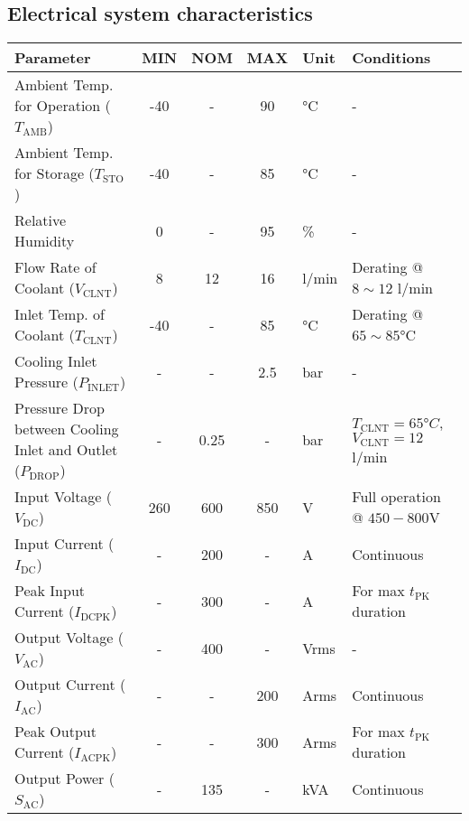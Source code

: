 \subsection{Electrical system characteristics}   
\begin{table}[H]
    \centering
    \begin{adjustbox}{width=\textwidth,center}
    \begin{tabular}{|l|c|c|c|l|l|}
        \hline
        \textbf{Parameter} & \textbf{MIN} & \textbf{NOM} & \textbf{MAX} & \textbf{Unit} & \textbf{Conditions} \\
        \hline
        Ambient Temp. for Operation ($T_{\text{AMB}}$) & -40 & - & 90 & °C & - \\
        \hline
        Ambient Temp. for Storage ($T_{\text{STO}}$) & -40 & - & 85 & °C & - \\
        \hline
        Relative Humidity & 0 & - & 95 & \% & - \\
        \hline
        Flow Rate of Coolant ($V_{\text{CLNT}}$) & 8 & 12 & 16 & l/min & Derating @ $8\sim12$ l/min \\
        \hline
        Inlet Temp. of Coolant ($T_{\text{CLNT}}$) & -40 & - & 85 & °C & Derating @ $65\sim85$°C \\
        \hline
        Cooling Inlet Pressure ($P_{\text{INLET}}$) & - & - & 2.5 & bar & - \\
        \hline
        Pressure Drop between Cooling Inlet and Outlet ($P_{\text{DROP}}$) & - & 0.25 & - & bar & $T_{\text{CLNT}}=65°C$, $V_{\text{CLNT}}=12$ l/min \\
        \hline
        Input Voltage ($V_{\text{DC}}$) & 260 & 600 & 850 & V & Full operation @ $450-800$V \\
        \hline
        Input Current ($I_{\text{DC}}$) & - & 200 & - & A & Continuous \\
        \hline
        Peak Input Current ($I_{\text{DCPK}}$) & - & 300 & - & A & For max $t_{\text{PK}}$ duration \\
        \hline
        Output Voltage ($V_{\text{AC}}$) & - & 400 & - & Vrms & - \\
        \hline
        Output Current ($I_{\text{AC}}$) & - & - & 200 & Arms & Continuous \\
        \hline
        Peak Output Current ($I_{\text{ACPK}}$) & - & - & 300 & Arms & For max $t_{\text{PK}}$ duration \\
        \hline
        Output Power ($S_{\text{AC}}$) & - & 135 & - & kVA & Continuous \\

\end{tabular}
\end{adjustbox}
\end{table}
